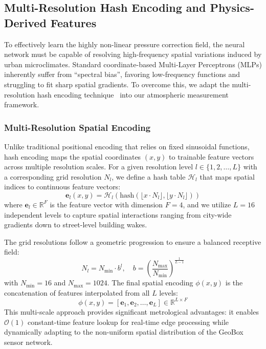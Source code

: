 \subsection{Multi-Resolution Hash Encoding and Physics-Derived Features}
\label{subsec:hash_and_features}

To effectively learn the highly non-linear pressure correction field, the neural network must be capable of resolving high-frequency spatial variations induced by urban microclimates. Standard coordinate-based Multi-Layer Perceptrons (MLPs) inherently suffer from ``spectral bias'', favoring low-frequency functions and struggling to fit sharp spatial gradients. To overcome this, we adapt the multi-resolution hash encoding technique~\cite{muller2022instant} into our atmospheric measurement framework.

\subsubsection{Multi-Resolution Spatial Encoding}
Unlike traditional positional encoding that relies on fixed sinusoidal functions, hash encoding maps the spatial coordinates $(x, y)$ to trainable feature vectors across multiple resolution scales. For a given resolution level $l \in \{1, 2, \dots, L\}$ with a corresponding grid resolution $N_l$, we define a hash table $\mathcal{H}_l$ that maps spatial indices to continuous feature vectors:
\begin{equation}
\mathbf{e}_l(x, y) = \mathcal{H}_l\left(\text{hash}\left(\lfloor x \cdot N_l \rfloor, \lfloor y \cdot N_l \rfloor\right)\right)
\label{eq:hash_lookup}
\end{equation}
where $\mathbf{e}_l \in \mathbb{R}^F$ is the feature vector with dimension $F=4$, and we utilize $L=16$ independent levels to capture spatial interactions ranging from city-wide gradients down to street-level building wakes. 

The grid resolutions follow a geometric progression to ensure a balanced receptive field:
\begin{equation}
N_l = N_{\text{min}} \cdot b^l, \quad b = \left(\frac{N_{\text{max}}}{N_{\text{min}}}\right)^{\frac{1}{L-1}}
\label{eq:resolution}
\end{equation}
with $N_{\text{min}} = 16$ and $N_{\text{max}} = 1024$. The final spatial encoding $\phi(x, y)$ is the concatenation of features interpolated from all $L$ levels:
\begin{equation}
\phi(x, y) = [\mathbf{e}_1, \mathbf{e}_2, \dots, \mathbf{e}_L] \in \mathbb{R}^{L \times F}
\label{eq:concat_encoding}
\end{equation}
This multi-scale approach provides significant metrological advantages: it enables $\mathcal{O}(1)$ constant-time feature lookup for real-time edge processing while dynamically adapting to the non-uniform spatial distribution of the GeoBox sensor network.

